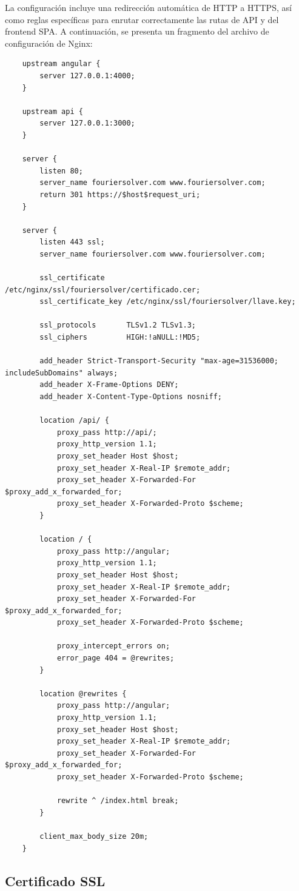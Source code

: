 La configuración incluye una redirección automática de HTTP a HTTPS, así como reglas específicas para enrutar correctamente las rutas de API y del frontend SPA. A continuación, se presenta un fragmento del archivo de configuración de Nginx:

\begin{verbatim}
	upstream angular {
		server 127.0.0.1:4000;
	}
	
	upstream api {
		server 127.0.0.1:3000;
	}
	
	server {
		listen 80;
		server_name fouriersolver.com www.fouriersolver.com;
		return 301 https://$host$request_uri;
	}
	
	server {
		listen 443 ssl;
		server_name fouriersolver.com www.fouriersolver.com;
		
		ssl_certificate     /etc/nginx/ssl/fouriersolver/certificado.cer;
		ssl_certificate_key /etc/nginx/ssl/fouriersolver/llave.key;
		
		ssl_protocols       TLSv1.2 TLSv1.3;
		ssl_ciphers         HIGH:!aNULL:!MD5;
		
		add_header Strict-Transport-Security "max-age=31536000; includeSubDomains" always;
		add_header X-Frame-Options DENY;
		add_header X-Content-Type-Options nosniff;
		
		location /api/ {
			proxy_pass http://api/;
			proxy_http_version 1.1;
			proxy_set_header Host $host;
			proxy_set_header X-Real-IP $remote_addr;
			proxy_set_header X-Forwarded-For $proxy_add_x_forwarded_for;
			proxy_set_header X-Forwarded-Proto $scheme;
		}
		
		location / {
			proxy_pass http://angular;
			proxy_http_version 1.1;
			proxy_set_header Host $host;
			proxy_set_header X-Real-IP $remote_addr;
			proxy_set_header X-Forwarded-For $proxy_add_x_forwarded_for;
			proxy_set_header X-Forwarded-Proto $scheme;
			
			proxy_intercept_errors on;
			error_page 404 = @rewrites;
		}
		
		location @rewrites {
			proxy_pass http://angular;
			proxy_http_version 1.1;
			proxy_set_header Host $host;
			proxy_set_header X-Real-IP $remote_addr;
			proxy_set_header X-Forwarded-For $proxy_add_x_forwarded_for;
			proxy_set_header X-Forwarded-Proto $scheme;
			
			rewrite ^ /index.html break;
		}
		
		client_max_body_size 20m;
	}
\end{verbatim}

\subsection{Certificado SSL}

